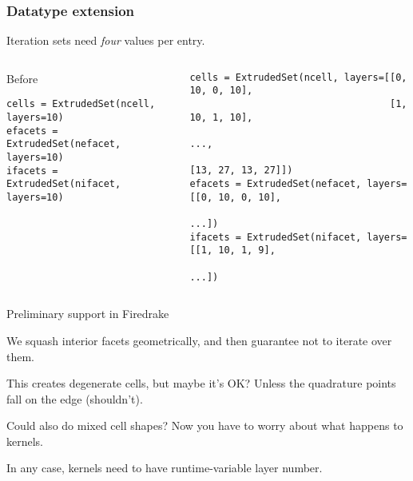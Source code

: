 \documentclass[presentation]{beamer}
\begin{document}
\begin{frame}[fragile]
  \frametitle{Datatype extension}
Iteration sets need \emph{four} values per entry.
  \begin{columns}
    \begin{column}{0.5\textwidth}
      Before
\begin{verbatim}
cells = ExtrudedSet(ncell, layers=10)
efacets = ExtrudedSet(nefacet, layers=10)
ifacets = ExtrudedSet(nifacet, layers=10)
\end{verbatim}
    \end{column}
    \begin{column}{0.5\textwidth}
\begin{verbatim}
cells = ExtrudedSet(ncell, layers=[[0, 10, 0, 10], 
                                   [1, 10, 1, 10],
                                   ...,
                                   [13, 27, 13, 27]])
efacets = ExtrudedSet(nefacet, layers=[[0, 10, 0, 10],
                                       ...])
ifacets = ExtrudedSet(nifacet, layers=[[1, 10, 1, 9],
                                       ...])
\end{verbatim}
    \end{column}
  \end{columns}
\end{frame}
\begin{frame}[plain]
  \begin{columns}
    \begin{column}{\textwidth}
    \end{column}
  \end{columns}
\end{frame}
\begin{frame}
  Preliminary support in Firedrake

  We squash interior facets geometrically, and then guarantee not to
  iterate over them.

  This creates degenerate cells, but maybe it's OK?  Unless the
  quadrature points fall on the edge (shouldn't).

  Could also do mixed cell shapes?  Now you have to worry about what
  happens to kernels.

  In any case, kernels need to have runtime-variable layer number.
\end{frame}
\end{document}
